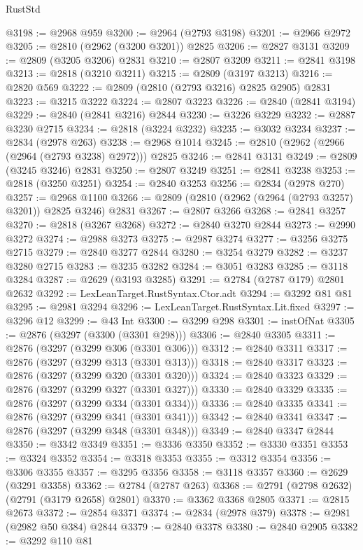 \begin{lexlean}{RustStd}
\begin{coremodule}
@3198 := @2968 @959
@3200 := @2964 (@2793 @3198)
@3201 := @2966 @2972
@3205 := @2810 (@2962 (@3200 @3201)) @2825
@3206 := @2827 @3131
@3209 := @2809 (@3205 @3206) @2831
@3210 := @2807 @3209
@3211 := @2841 @3198
@3213 := @2818 (@3210 @3211)
@3215 := @2809 (@3197 @3213)
@3216 := @2820 @569
@3222 := @2809 (@2810 (@2793 @3216) @2825 @2905) @2831
@3223 := @3215 @3222
@3224 := @2807 @3223
@3226 := @2840 (@2841 @3194)
@3229 := @2840 (@2841 @3216) @2844
@3230 := @3226 @3229
@3232 := @2887 @3230 @2715
@3234 := @2818 (@3224 @3232)
@3235 := @3032 @3234
@3237 := @2834 (@2978 @263)
@3238 := @2968 @1014
@3245 := @2810 (@2962 (@2966 (@2964 (@2793 @3238) @2972))) @2825
@3246 := @2841 @3131
@3249 := @2809 (@3245 @3246) @2831
@3250 := @2807 @3249
@3251 := @2841 @3238
@3253 := @2818 (@3250 @3251)
@3254 := @2840 @3253
@3256 := @2834 (@2978 @270)
@3257 := @2968 @1100
@3266 := @2809 (@2810 (@2962 (@2964 (@2793 @3257) @3201)) @2825 @3246) @2831
@3267 := @2807 @3266
@3268 := @2841 @3257
@3270 := @2818 (@3267 @3268)
@3272 := @2840 @3270 @2844
@3273 := @2990 @3272
@3274 := @2988 @3273
@3275 := @2987 @3274
@3277 := @3256 @3275 @2715
@3279 := @2840 @3277 @2844
@3280 := @3254 @3279
@3282 := @3237 @3280 @2715
@3283 := @3235 @3282
@3284 := @3051 @3283
@3285 := @3118 @3284
@3287 := @2629 (@3193 @3285)
@3291 := @2784 (@2787 @179) @2801 @2632
@3292 := LexLeanTarget.RustSyntax.Ctor.adt
@3294 := @3292 @81 @81
@3295 := @2981 @3294
@3296 := LexLeanTarget.RustSyntax.Lit.fixed
@3297 := @3296 @12
@3299 := @43 Int
@3300 := @3299 @298
@3301 := instOfNat
@3305 := @2876 (@3297 (@3300 (@3301 @298)))
@3306 := @2840 @3305
@3311 := @2876 (@3297 (@3299 @306 (@3301 @306)))
@3312 := @2840 @3311
@3317 := @2876 (@3297 (@3299 @313 (@3301 @313)))
@3318 := @2840 @3317
@3323 := @2876 (@3297 (@3299 @320 (@3301 @320)))
@3324 := @2840 @3323
@3329 := @2876 (@3297 (@3299 @327 (@3301 @327)))
@3330 := @2840 @3329
@3335 := @2876 (@3297 (@3299 @334 (@3301 @334)))
@3336 := @2840 @3335
@3341 := @2876 (@3297 (@3299 @341 (@3301 @341)))
@3342 := @2840 @3341
@3347 := @2876 (@3297 (@3299 @348 (@3301 @348)))
@3349 := @2840 @3347 @2844
@3350 := @3342 @3349
@3351 := @3336 @3350
@3352 := @3330 @3351
@3353 := @3324 @3352
@3354 := @3318 @3353
@3355 := @3312 @3354
@3356 := @3306 @3355
@3357 := @3295 @3356
@3358 := @3118 @3357
@3360 := @2629 (@3291 @3358)
@3362 := @2784 (@2787 @263)
@3368 := @2791 (@2798 @2632) (@2791 (@3179 @2658) @2801)
@3370 := @3362 @3368 @2805
@3371 := @2815 @2673
@3372 := @2854 @3371
@3374 := @2834 (@2978 @379)
@3378 := @2981 (@2982 @50 @384) @2844
@3379 := @2840 @3378
@3380 := @2840 @2905
@3382 := @3292 @110 @81

\end{coremodule}
\end{lexlean}
